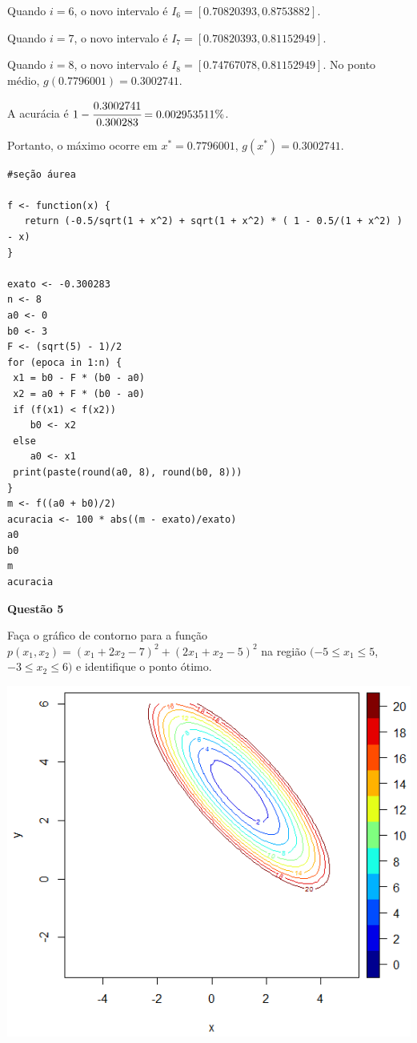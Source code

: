 \documentclass{rbfin}
\begin{document}
Quando $i = 6$, o novo intervalo é $I_6 = [0.70820393, 0.8753882]$.

Quando $i = 7$, o novo intervalo é $I_7 = [0.70820393, 0.81152949]$.

Quando $i = 8$, o novo intervalo é $I_8 = [0.74767078, 0.81152949]$. No ponto médio, $g(0.7796001) = 0.3002741$.

A acurácia é $1 - \cfrac{0.3002741}{0.300283} = 0.002953511\%$.

Portanto, o máximo ocorre em $x^* = 0.7796001$, $g(x^*) = 0.3002741$.

\singlespacing

\newpage

\begin{verbatim}
#seção áurea

f <- function(x) {
   return (-0.5/sqrt(1 + x^2) + sqrt(1 + x^2) * ( 1 - 0.5/(1 + x^2) ) - x)
}

exato <- -0.300283
n <- 8
a0 <- 0
b0 <- 3
F <- (sqrt(5) - 1)/2
for (epoca in 1:n) {
 x1 = b0 - F * (b0 - a0)
 x2 = a0 + F * (b0 - a0)
 if (f(x1) < f(x2))
    b0 <- x2
 else
    a0 <- x1 
 print(paste(round(a0, 8), round(b0, 8)))
}
m <- f((a0 + b0)/2)
acuracia <- 100 * abs((m - exato)/exato)
a0
b0
m
acuracia
\end{verbatim}

\vspace{6mm}

\large

\textbf{Questão 5}

\normalsize

\vspace{6mm}

\doublespacing

Faça o gráfico de contorno para a função $p(x_1, x_2) = (x_1 + 2x_2 - 7)^2 +(2x_1 + x_2 - 5)^2$ na região $(-5 \le x_1 \le 5$, $-3 \le x_2 \le 6)$ e identifique o ponto ótimo.

\begin{center}
\includegraphics[scale=0.666]{q5}
\end{center}
\end{document}
